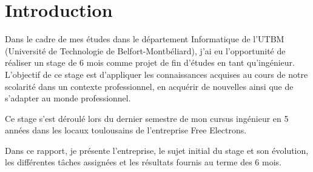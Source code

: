 \chapter*{Introduction}

Dans le cadre de mes études dans le département Informatique de l'UTBM (Université de Technologie de Belfort-Montbéliard), j'ai eu l'opportunité de réaliser un stage de 6 mois comme projet de fin d'études en tant qu'ingénieur. L'objectif de ce stage est d'appliquer les connaissances acquises au cours de notre scolarité dans un contexte professionnel, en acquérir de nouvelles ainsi que de s'adapter au monde professionnel.

Ce stage s'est déroulé lors du dernier semestre de mon cursus ingénieur en 5 années dans les locaux toulousains de l'entreprise Free Electrons.

Dans ce rapport, je présente l'entreprise, le sujet initial du stage et son évolution, les différentes tâches assignées et les résultats fournis au terme des 6 mois.
